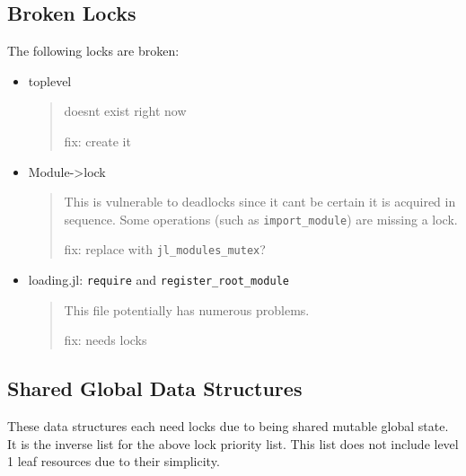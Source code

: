 \hypertarget{9065842407229995149}{}


\subsection{Broken Locks}



The following locks are broken:



\begin{itemize}
\item toplevel

\begin{quote}
doesn{\textquotesingle}t exist right now

fix: create it

\end{quote}

\item Module->lock

\begin{quote}
This is vulnerable to deadlocks since it can{\textquotesingle}t be certain it is acquired in sequence. Some operations (such as \texttt{import\_module}) are missing a lock.

fix: replace with \texttt{jl\_modules\_mutex}?

\end{quote}

\item loading.jl: \texttt{require} and \texttt{register\_root\_module}

\begin{quote}
This file potentially has numerous problems.

fix: needs locks

\end{quote}
\end{itemize}


\hypertarget{1067922422509615580}{}


\subsection{Shared Global Data Structures}



These data structures each need locks due to being shared mutable global state. It is the inverse list for the above lock priority list. This list does not include level 1 leaf resources due to their simplicity.



